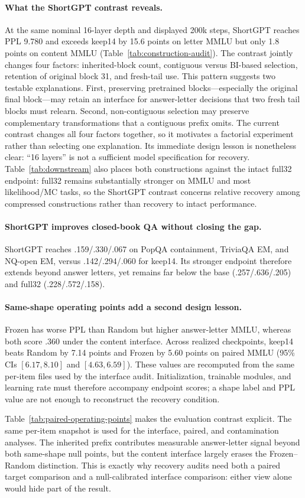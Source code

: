 \paragraph{What the ShortGPT contrast reveals.}
At the same nominal 16-layer depth and displayed 200k steps, ShortGPT reaches
PPL 9.780 and exceeds keep14 by 15.6 points on letter MMLU but only 1.8 points
on content MMLU (Table~\ref{tab:construction-audit}). The contrast jointly
changes four factors: inherited-block count, contiguous versus BI-based
selection, retention of original block 31, and fresh-tail use.
This pattern suggests two testable explanations. First, preserving pretrained
blocks---especially the original final block---may retain an interface for
answer-letter decisions that two fresh tail blocks must relearn. Second,
non-contiguous selection may preserve complementary transformations that a
contiguous prefix omits. The current contrast changes all four factors
together, so it motivates a factorial experiment rather than selecting one
explanation. Its immediate design lesson is nonetheless clear: ``16 layers''
is not a sufficient model specification for recovery.
Table~\ref{tab:downstream} also places both constructions against the intact
full32 endpoint: full32 remains substantially stronger on MMLU and most
likelihood/MC tasks, so the ShortGPT contrast concerns relative recovery among
compressed constructions rather than recovery to intact performance.

\paragraph{ShortGPT improves closed-book QA without closing the gap.}
ShortGPT reaches .159/.330/.067 on PopQA containment, TriviaQA EM, and NQ-open
EM, versus .142/.294/.060 for keep14. Its stronger endpoint therefore extends
beyond answer letters, yet remains far below the base (.257/.636/.205) and
full32 (.228/.572/.158).

\paragraph{Same-shape operating points add a second design lesson.}
Frozen has worse PPL than Random but higher answer-letter MMLU, whereas both
score .360 under the content interface. Across realized checkpoints, keep14
beats Random by 7.14 points and Frozen by 5.60 points on paired MMLU
(95\% CIs $[6.17,8.10]$ and $[4.63,6.59]$). These values are recomputed from
the same per-item files used by the interface audit. Initialization, trainable modules,
and learning rate must therefore accompany endpoint scores; a shape label and
PPL value are not enough to reconstruct the recovery condition.


Table~\ref{tab:paired-operating-points} makes the evaluation contrast explicit.
The same per-item snapshot is used for the interface, paired, and contamination
analyses.
The inherited prefix contributes measurable answer-letter signal beyond both
same-shape null points, but the content interface largely erases the
Frozen--Random distinction. This is exactly why recovery audits need both a
paired target comparison and a null-calibrated interface comparison: either
view alone would hide part of the result.
